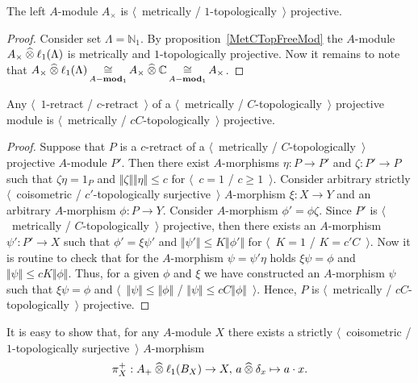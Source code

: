 \begin{proposition}\label{UnitalAlgIsMetTopProj} The left $A$-module $A_\times$
is $\langle$~metrically / $1$-topologically~$\rangle$ projective.
\end{proposition} 
\begin{proof} Consider set $\Lambda=\mathbb{N}_1$. 
By proposition~\ref{MetCTopFreeMod} the 
$A$-module $A_\times\mathbin{\widehat{\otimes}}\ell_1(\Lambda)$ is metrically 
and $1$-topologically projective. Now it remains to note that 
$A_\times\mathbin{\widehat{\otimes}}\ell_1(\Lambda)
\mathop{\mathbin{\cong}}\limits_{A-\mathbf{mod}_1}
A_\times\mathbin{\widehat{\otimes}} \mathbb{C}
\mathop{\mathbin{\cong}}\limits_{A-\mathbf{mod}_1}
A_\times$.
\end{proof}

\begin{proposition}\label{RetrMetCTopProjIsMetCTopProj} Any 
$\langle$~$1$-retract / $c$-retract~$\rangle$ of a 
$\langle$~metrically / $C$-topologically~$\rangle$ projective module is
$\langle$~metrically / $c C$-topologically~$\rangle$ projective.
\end{proposition}
\begin{proof} Suppose that $P$ is a $c$-retract of a 
$\langle$~metrically / $C$-topologically~$\rangle$ projective $A$-module $P'$.
Then there exist $A$-morphisms $\eta:P\to P'$ and $\zeta: P'\to P$ such that
$\zeta\eta=1_{P}$ and $\Vert\zeta\Vert\Vert\eta\Vert\leq c$ 
for $\langle$~$c=1$ / $c\geq 1$~$\rangle$. Consider arbitrary
strictly $\langle$~coisometric / $c'$-topologically surjective~$\rangle$ 
$A$-morphism $\xi:X\to Y$ and an arbitrary $A$-morphism $\phi:P\to Y$. 
Consider $A$-morphism $\phi'=\phi\zeta$. Since $P'$ is 
$\langle$~metrically / $C$-topologically~$\rangle$ projective, then there 
exists an $A$-morphism $\psi':P'\to X$ such that $\phi'=\xi\psi'$ 
and $\Vert\psi'\Vert \leq K\Vert\phi'\Vert$ 
for $\langle$~$K=1$ / $K=c' C$~$\rangle$. Now it is routine to check that 
for the $A$-morphism $\psi=\psi'\eta$ 
holds $\xi\psi=\phi$ and $\Vert\psi\Vert \leq cK\Vert\phi\Vert$. 
Thus, for a given $\phi$ and $\xi$ we have
constructed an $A$-morphism $\psi$ such that $\xi\psi=\phi$  and
$\langle$~$\Vert\psi\Vert\leq\Vert\phi\Vert$ / 
$\Vert \psi\Vert\leq c C\Vert\phi\Vert$~$\rangle$. Hence, $P$ 
is $\langle$~metrically / $c C$-topologically~$\rangle$ projective.
\end{proof}

It is easy to show that, for any $A$-module $X$ there exists 
a strictly $\langle$~coisometric / $1$-topologically surjective~$\rangle$ 
$A$-morphism
$$
\pi_X^+:A_+\mathbin{\widehat{\otimes}} \ell_1(B_X)\to X,\, a\mathbin{\widehat{\otimes}} \delta_x\mapsto a\cdot x.
$$

